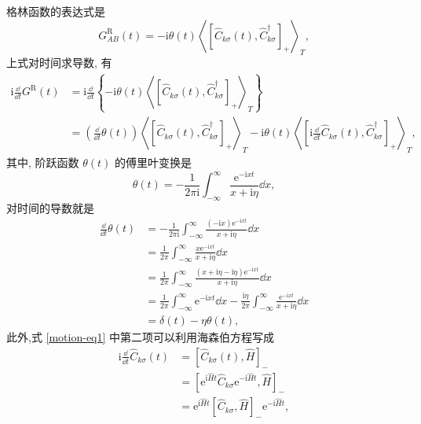格林函数的表达式是
\begin{equation}
    G_{AB}^{\mathrm{R}}(t)=-\mathrm{i}\theta(t)\left\langle \left[ \hat{C}_{k\sigma}^{ }(t),\hat{C}_{k\sigma}^{\dagger} \right]_+ \right\rangle_T,
\end{equation}
上式对时间求导数, 有
  \begin{align}\label{motion-eq1}
        \mathrm{i}\frac{\dd}{\dd t}G^{\mathrm{R}}(t)&=\mathrm{i}\frac{\dd}{\dd t}\left\{ -\mathrm{i}\theta(t)\left\langle \left[ \hat{C}_{k\sigma}^{ }(t),\hat{C}_{k\sigma}^{\dagger} \right]_+ \right\rangle_T \right\}\nonumber\\
        &=\left( \frac{\dd}{\dd t}\theta(t) \right) \left\langle \left[ \hat{C}_{k\sigma}^{ }(t),\hat{C}_{k\sigma}^{\dagger} \right]_+ \right\rangle_T-\mathrm{i}\theta(t)\left\langle \left[ \mathrm{i}\frac{\dd}{\dd t}\hat{C}_{k\sigma}^{ }(t),\hat{C}_{k\sigma}^{\dagger} \right]_+ \right\rangle_T,
    \end{align}
其中, 阶跃函数 $\theta(t)$ 的傅里叶变换是
\begin{equation}
    \theta(t)=-\frac{1}{2\pi \mathrm{i}}\int_{-\infty}^{\infty}\frac{\mathrm{e}^{-\mathrm{i} xt}}{x+\mathrm{i}\eta}\dd x,
\end{equation}
对时间的导数就是
   \begin{align}\label{theta-fourier}
        \frac{\dd}{\dd t}\theta(t)&=-\frac{1}{2\pi\mathrm{i}}\int_{-\infty}^{\infty}\frac{(-\mathrm{i} x)\mathrm{e}^{-\mathrm{i} xt}}{x+\mathrm{i}\eta}\dd x\nonumber\\
        &=\frac{1}{2\pi}\int_{-\infty}^{\infty}\frac{x\mathrm{e}^{-\mathrm{i} xt}}{x+\mathrm{i}\eta}\dd x\nonumber\\
        &=\frac{1}{2\pi}\int_{-\infty}^{\infty}\frac{(x+\mathrm{i}\eta-\mathrm{i}\eta)\mathrm{e}^{-\mathrm{i} xt}}{x+\mathrm{i} \eta}\dd x\nonumber\\
        &=\frac{1}{2\pi}\int_{-\infty}^{\infty}\mathrm{e}^{-\mathrm{i} xt}\dd x-\frac{\mathrm{i}\eta}{2\pi}\int_{-\infty}^{\infty}\frac{\mathrm{e}^{-\mathrm{i} xt}}{x+\mathrm{i}\eta}\dd x\nonumber\\
        &=\delta(t)-\eta\theta(t),
    \end{align}
此外,式 \eqref{motion-eq1} 中第二项可以利用海森伯方程写成
  \begin{align}\label{heisenberg1}
        \mathrm{i}\frac{\dd}{\dd t}\hat{C}_{k\sigma}^{ }(t)&=\left[ \hat{C}_{k\sigma}(t),\hat{H} \right]_-\nonumber\\
        &=\left[ \mathrm{e}^{\mathrm{i}\hat{H}t}\hat{C}_{k\sigma}^{ }\mathrm{e}^{-\mathrm{i}\hat{H}t},\hat{H} \right]_-\nonumber\\
        &=\mathrm{e}^{\mathrm{i}\hat{H}t}\left[ \hat{C}_{k\sigma},\hat{H} \right]_-\mathrm{e}^{-\mathrm{i}\hat{H}t},
    \end{align}
